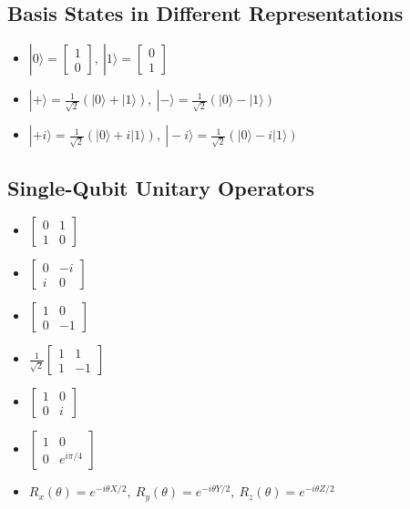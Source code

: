 \documentclass{article}
\begin{document}
\subsection*{Basis States in Different Representations}
\begin{itemize}
    \item $|0\rangle = \begin{bmatrix} 1 \\ 0 \end{bmatrix},\ |1\rangle = \begin{bmatrix} 0 \\ 1 \end{bmatrix}$
    \item $|+\rangle = \frac{1}{\sqrt{2}}(|0\rangle + |1\rangle),\ |-\rangle = \frac{1}{\sqrt{2}}(|0\rangle - |1\rangle)$
    \item $|+i\rangle = \frac{1}{\sqrt{2}}(|0\rangle + i|1\rangle),\ |-i\rangle = \frac{1}{\sqrt{2}}(|0\rangle - i|1\rangle)$
\end{itemize}

\subsection*{Single-Qubit Unitary Operators}
\begin{itemize}
    \item $\begin{bmatrix} 0 & 1 \\ 1 & 0 \end{bmatrix}$
    \item $\begin{bmatrix} 0 & -i \\ i & 0 \end{bmatrix}$
    \item $\begin{bmatrix} 1 & 0 \\ 0 & -1 \end{bmatrix}$
    \item $\frac{1}{\sqrt{2}}\begin{bmatrix} 1 & 1 \\ 1 & -1 \end{bmatrix}$
    \item $\begin{bmatrix} 1 & 0 \\ 0 & i \end{bmatrix}$
    \item $\begin{bmatrix} 1 & 0 \\ 0 & e^{i\pi/4} \end{bmatrix}$
    \item $R_x(\theta) = e^{-i\theta X/2},\ R_y(\theta) = e^{-i\theta Y/2},\ R_z(\theta) = e^{-i\theta Z/2}$
\end{itemize}
\end{document}
